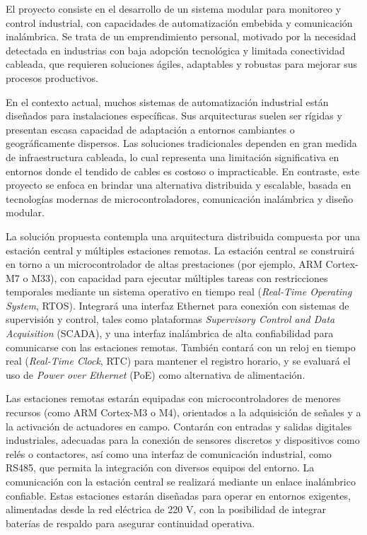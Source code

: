 \documentclass[
11pt, %
]{charter}
\begin{document}
El proyecto consiste en el desarrollo de un sistema modular para monitoreo y control industrial, con capacidades de automatización embebida y comunicación inalámbrica. Se trata de un emprendimiento personal, motivado por la necesidad detectada en industrias con baja adopción tecnológica y limitada conectividad cableada, que requieren soluciones ágiles, adaptables y robustas para mejorar sus procesos productivos.

En el contexto actual, muchos sistemas de automatización industrial están diseñados para instalaciones específicas. Sus arquitecturas suelen ser rígidas y presentan escasa capacidad de adaptación a entornos cambiantes o geográficamente dispersos. Las soluciones tradicionales dependen en gran medida de infraestructura cableada, lo cual representa una limitación significativa en entornos donde el tendido de cables es costoso o impracticable. En contraste, este proyecto se enfoca en brindar una alternativa distribuida y escalable, basada en tecnologías modernas de microcontroladores, comunicación inalámbrica y diseño modular.

La solución propuesta contempla una arquitectura distribuida compuesta por una estación central y múltiples estaciones remotas. La estación central se construirá en torno a un microcontrolador de altas prestaciones (por ejemplo, ARM Cortex-M7 o M33), con capacidad para ejecutar múltiples tareas con restricciones temporales mediante un sistema operativo en tiempo real (\textit{Real-Time Operating System}, RTOS). Integrará una interfaz Ethernet para conexión con sistemas de supervisión y control, tales como plataformas \textit{Supervisory Control and Data Acquisition} (SCADA), y una interfaz inalámbrica de alta confiabilidad para comunicarse con las estaciones remotas. También contará con un reloj en tiempo real (\textit{Real-Time Clock}, RTC) para mantener el registro horario, y se evaluará el uso de \textit{Power over Ethernet} (PoE) como alternativa de alimentación.

Las estaciones remotas estarán equipadas con microcontroladores de menores recursos (como ARM Cortex-M3 o M4), orientados a la adquisición de señales y a la activación de actuadores en campo. Contarán con entradas y salidas digitales industriales, adecuadas para la conexión de sensores discretos y dispositivos como relés o contactores, así como una interfaz de comunicación industrial, como RS485, que permita la integración con diversos equipos del entorno. La comunicación con la estación central se realizará mediante un enlace inalámbrico confiable. Estas estaciones estarán diseñadas para operar en entornos exigentes, alimentadas desde la red eléctrica de 220 V, con la posibilidad de integrar baterías de respaldo para asegurar continuidad operativa.
\end{document}
